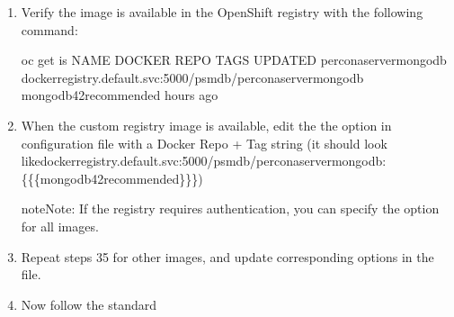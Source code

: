 \documentclass[letterpaper,10pt,english]{sphinxmanual}
\begin{document}
\begin{enumerate}
\item {} 
Verify the image is available in the OpenShift registry with the following command:

\begin{sphinxVerbatim}[commandchars=\\\{\}]
\PYGZdl{} oc get is
NAME                              DOCKER REPO                                                             TAGS             UPDATED
percona\PYGZhy{}server\PYGZhy{}mongodb            docker\PYGZhy{}registry.default.svc:5000/psmdb/percona\PYGZhy{}server\PYGZhy{}mongodb  mongodb42recommended   hours ago
\end{sphinxVerbatim}

\item {} 
When the custom registry image is available, edit the the  option in  configuration file with a Docker Repo + Tag string (it should look like\textasciigrave{}\textasciigrave{}docker\sphinxhyphen{}registry.default.svc:5000/psmdb/percona\sphinxhyphen{}server\sphinxhyphen{}mongodb:\{\{\{mongodb42recommended\}\}\}\textasciigrave{}\textasciigrave{})

\begin{sphinxadmonition}{note}{Note:}
If the registry requires authentication, you can specify the  option for all images.
\end{sphinxadmonition}

\item {} 
Repeat steps 3\sphinxhyphen{}5 for other images, and update corresponding options
in the  file.

\item {} 
Now follow the standard 

\end{enumerate}
\end{document}
